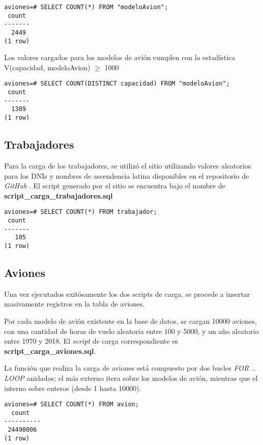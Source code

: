 \vspace*{5mm}
\lstset{style=sql}
\begin{lstlisting}
aviones=# SELECT COUNT(*) FROM "modeloAvion";
 count 
-------
  2449
(1 row)
\end{lstlisting}

Los valores cargados para los modelos de avión cumplen con la estadística V(capacidad, modeloAvion) $\geq$ 1000

\clearpage
\lstset{style=sql}
\begin{lstlisting}
aviones=# SELECT COUNT(DISTINCT capacidad) FROM "modeloAvion";
 count 
-------
  1389
(1 row)
\end{lstlisting}

\subsection{Trabajadores}

Para la carga de los trabajadores, se utilizó el sitio \cite{generatedata} utilizando valores aleatorios para los DNIs y nombres de ascendencia latina disponibles en el repositorio de \emph{GitHub} \cite{apellidos:2012}. El script generado por el sitio se encuentra bajo el nombre de \textbf{script\_carga\_trabajadores.sql} 

\vspace*{5mm}
\lstset{style=sql}
\begin{lstlisting}
aviones=# SELECT COUNT(*) FROM trabajador;
 count 
-------
   105
(1 row)
\end{lstlisting}


\subsection{Aviones}
Una vez ejecutados exitósamente los dos scripts de carga, se procede a insertar masivamente registros en la tabla de aviones. 

Por cada modelo de avión existente en la base de datos, se cargan 10000 aviones, con una cantidad de horas de vuelo aleatoria entre 100 y 5000, y un año aleatorio entre 1970 y 2018. El \emph{script} de carga correspondiente es \textbf{script\_carga\_aviones.sql}.

La función que realiza la carga de aviones está compuesto por dos bucles \emph{FOR .. LOOP} anidados; el más externo itera sobre los modelos de avión, mientras que el interno sobre enteros (desde 1 hasta 10000). 

\vspace*{5mm}
\lstset{style=sql}
\begin{lstlisting}
aviones=# SELECT COUNT(*) FROM avion;
  count   
----------
 24490006
(1 row)
\end{lstlisting}

